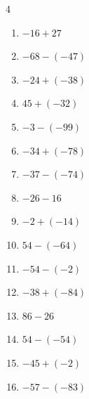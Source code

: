 \begin{multicols}{4}
\begin{enumerate}
  \item $-16+27$

        \phantom{$=11$}

  \item $-68-(-47)$

        \phantom{$=-21$}

  \item $-24+(-38)$

        \phantom{$=-62$}

  \item $45+(-32)$

        \phantom{$=13$}

  \item $-3-(-99)$

        \phantom{$=96$}

  \item $-34+(-78)$

        \phantom{$=-112$}

  \item $-37-(-74)$

        \phantom{$=37$}

  \item $-26-16$

        \phantom{$=-42$}

  \item $-2+(-14)$

        \phantom{$=-16$}

\columnbreak %

  \item $54-(-64)$

        \phantom{$=118$}

  \item $-54-(-2)$

        \phantom{$=-52$}

  \item $-38+(-84)$

        \phantom{$=-122$}

  \item $86-26$

        \phantom{$=60$}

  \item $54-(-54)$

        \phantom{$=108$}

  \item $-45+(-2)$

        \phantom{$=-47$}

  \item $-57-(-83)$


\end{enumerate}
\end{multicols}
